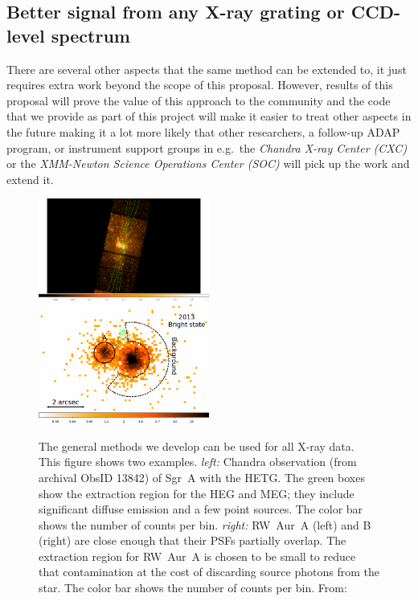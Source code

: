 \documentclass[fleqn,12pt,onecolumn]{SelfArx} %
\begin{document}
\subsection{Better signal from any X-ray grating or CCD-level spectrum}
\label{sect:impact_other}
There are several other aspects that the same method can be extended to, it just requires extra work beyond the scope of this proposal. However, results of this proposal will prove the value of this approach to the community and the code that we provide as part of this project will make it easier to treat other aspects in the future making it a lot more likely that other researchers, a follow-up ADAP program, or instrument support groups in e.g.\ the \emph{Chandra X-ray Center (CXC)} or the \emph{XMM-Newton Science Operations Center (SOC)} will pick up the work and extend it.

\begin{figure}
    \includegraphics[width=0.5\textwidth]{SgrAstar}
    \includegraphics[width=0.5\textwidth]{schneider_2015}
    \caption{
        The general methods we develop can be used for all X-ray data. This figure shows two examples.
        \emph{left:} Chandra observation (from archival ObsID 13842) of Sgr~A\* with the HETG. The green boxes show the extraction region for the HEG and MEG; they include significant diffuse emission and a few point sources. The color bar shows the number of counts per bin.
        \emph{right:} RW~Aur~A (left) and B (right) are close enough that their PSFs partially overlap. The extraction region for RW~Aur~A is chosen to be small to reduce that contamination at the cost of discarding source photons from the star. The color bar shows the number of counts per bin. From: \cite{2015A&A...584L...9S}\label{fig:other_uses}}
\end{figure}
\end{document}
